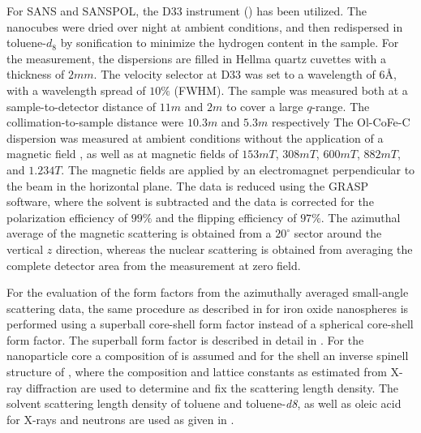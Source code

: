 \documentclass[\main/dresen_thesis.tex]{subfiles}
\begin{document}
    For SANS and SANSPOL, the D33 instrument () has been utilized.
    The nanocubes were dried over night at ambient conditions, and then redispersed in toluene-$\mathit{d_8}$ by sonification to minimize the hydrogen content in the sample.
    For the measurement, the dispersions are filled in Hellma quartz cuvettes with a thickness of $2 \unit{mm}$.
    The velocity selector at D33 was set to a wavelength of $6 \unit{\angstrom}$, with a wavelength spread of $10 \%$ (FWHM).
    The sample was measured both at a sample-to-detector distance of $11 \unit{m}$ and $2 \unit{m}$ to cover a large $q$-range.
    The collimation-to-sample distance were $10.3 \unit{m}$ and $5.3 \unit{m}$ respectively
    The Ol-CoFe-C dispersion was measured at ambient conditions without the application of a magnetic field , as well as at magnetic fields of $153 \unit{mT}$, $308 \unit{mT}$, $600 \unit{mT}$, $882 \unit{mT}$, and $1.234 \unit{T}$.
    The magnetic fields are applied by an electromagnet perpendicular to the beam in the horizontal plane.
    The data is reduced using the GRASP software, where the solvent is subtracted and the data is corrected for the polarization efficiency of $99 \%$ and the flipping efficiency of $97 \%$.
    The azimuthal average of the magnetic scattering is obtained from a $20 ^\circ$ sector around the vertical $z$ direction, whereas the nuclear scattering is obtained from averaging the complete detector area from the measurement at zero field.

    For the evaluation of the form factors from the azimuthally averaged small-angle scattering data, the same procedure as described in  for iron oxide nanospheres is performed using a superball core-shell form factor instead of a spherical core-shell form factor.
    The superball form factor is described in detail in .
    For the nanoparticle core a composition of  is assumed and for the shell an inverse spinell structure of , where the composition and lattice constants as estimated from X-ray diffraction are used to determine and fix the scattering length density.
    The solvent scattering length density of toluene and toluene-\textit{d8}, as well as oleic acid for X-rays and neutrons are used as given in .
\end{document}
